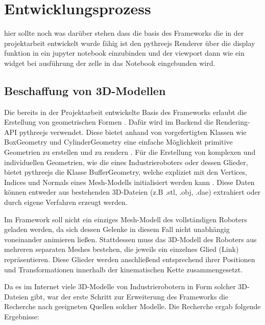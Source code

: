 \section{Entwicklungsprozess}
hier sollte noch was darüber stehen dass die basis des Frameworks die in der projektarbeit entwickelt wurde fähig ist den pythreejs Renderer
über die display funktion in ein jupyter notebook einzubinden und der viewport dann wie ein widget bei ausführung der zelle in das Notebook eingebunden wird.


\subsection{Beschaffung von 3D-Modellen}
Die bereits in der Projektarbeit entwickelte Basis des Frameworks erlaubt
die Erstellung von geometrischen Formen . 
Dafür wird im Backend die Rendering-API pythreejs verwendet.
Diese bietet anhand von vorgefertigten Klassen wie BoxGeometry und CylinderGeometry eine einfache
Möglichkeit primitive Geometrien zu erstellen und zu rendern .
Für die Erstellung von komplexen und individuellen Geometrien, wie die eines Industrieroboters oder dessen Glieder,
bietet pythreejs die Klasse BufferGeometry, welche expliziet mit den Vertices, Indices und Normals
eines Mesh-Modells initialisiert werden kann . Diese Daten können entweder aus bestehenden 3D-Dateien
(z.B .stl, .obj, .dae) extrahiert oder durch eigene Verfahren erzeugt werden.

Im Framework soll nicht ein einziges Mesh-Modell des vollständigen Roboters geladen werden,
da sich dessen Gelenke in diesem Fall nicht unabhängig voneinander animieren ließen.
Stattdessen muss das 3D-Modell des Roboters aus mehreren separaten Meshes bestehen,
die jeweils ein einzelnes Glied (Link) repräsentieren.
Diese Glieder werden anschließend entsprechend ihrer Positionen und Transformationen innerhalb der kinematischen Kette zusammengesetzt.

Da es im Internet viele 3D-Modelle von Industrierobotern in Form solcher 3D-Dateien gibt,
war der erste Schritt zur Erweiterung des Frameworks die Recherche nach geeigneten Quellen solcher Modelle.
Die Recherche ergab folgende Ergebnisse:

